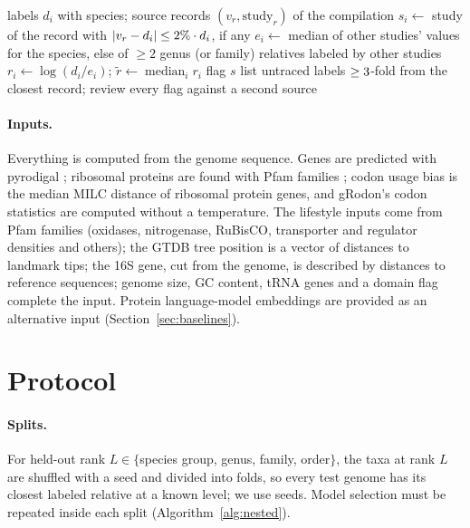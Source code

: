 \documentclass{article}
\begin{document}
\begin{algorithm}[t]
\caption{Study-level label check}\label{alg:audit}
\small
\begin{algorithmic}[1]
\Require labels $d_i$ with species; source records $(v_r,\mathrm{study}_r)$ of the compilation
  \State $s_i\gets$ study of the record with $|v_r-d_i|\le2\%\cdot d_i$, if any
  \State $e_i\gets$ median of other studies' values for the species, else of $\ge 2$ genus (or family) relatives labeled by other studies
\EndFor
{}
  \State $r_i\gets\log(d_i/e_i)$; $\tilde r\gets\operatorname{median}_i r_i$
   flag $s$ \EndIf
\EndFor
\State list untraced labels $\ge3$-fold from the closest record; review every flag against a second source
\end{algorithmic}
\end{algorithm}

\paragraph{Inputs.} Everything is computed from the genome sequence. Genes are predicted with pyrodigal
\citep{hyatt2010,larralde2022}; ribosomal proteins are found with \NRibosomalFamilies Pfam families \citep{mistry2021,eddy2011};
codon usage bias is the median MILC distance \citep{supek2005} of ribosomal protein genes, and gRodon's \NGRodonFeaturesWord
codon statistics are computed without a temperature. The \NLifestyleFeatures lifestyle inputs come from \NLifestyleFamilies Pfam
families (oxidases, nitrogenase, RuBisCO, transporter and regulator densities and others); the GTDB tree position is a
vector of distances to \NLandmarks landmark tips; the 16S gene, cut from the genome, is described by distances to
\NLandmarks reference sequences; genome size, GC content, tRNA genes and a domain flag complete the input. Protein
language-model embeddings are provided as an alternative input (Section~\ref{sec:baselines}).



\section{Protocol}\label{sec:protocol}
\paragraph{Splits.} For held-out rank $L\in\{$species group, genus, family, order$\}$, the taxa at rank $L$ are shuffled
with a seed and divided into \NFolds folds, so every test genome has its closest labeled relative at a known level; we use
\NSeedsHeadline seeds. Model selection must be repeated inside each split (Algorithm~\ref{alg:nested}).
\end{document}
